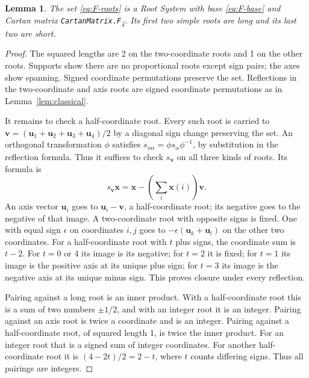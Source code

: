\documentclass[11pt]{amsart}
\newcommand\Zu{{\mathbf u}}
\newcommand\Zv{{\mathbf v}}
\newcommand\Zx{{\mathbf x}}
\newcommand\inv{^{-1}}
\newtheorem{lemma}[theorem]{Lemma}
\theoremstyle{definition}
\begin{document}
\begin{lemma}\label{lem:F}
The set \eqref{eq:F-roots} is a Root System with base \eqref{eq:F-base}
and Cartan matrix \texttt{CartanMatrix.F}\textsubscript{4}.
Its first two simple roots are long and its last two are short.
\end{lemma}
\begin{proof}
The squared lengths are 2 on the two-coordinate roots and 1 on the other
roots. Supports show there are no proportional roots except sign pairs;
the axes show spanning. Signed coordinate permutations preserve the set.
Reflections in the two-coordinate and axis roots are signed coordinate
permutations as in Lemma~\ref{lem:classical}.

It remains to check a half-coordinate root. Every such root is carried
to $\Zv=(\Zu_1+\Zu_2+\Zu_3+\Zu_4)/2$ by a diagonal sign change
preserving the set. An orthogonal transformation $\phi$ satisfies
$s_{\phi\alpha}=\phi s_\alpha\phi\inv$, by substitution in the reflection
formula. Thus it suffices to check $s_\Zv$ on all three kinds of
roots. Its formula is
\[
 s_\Zv\Zx=\Zx-\left(\sum_i\Zx(i)\right)\Zv.
\]
An axis vector $\Zu_i$ goes to $\Zu_i-\Zv$, a half-coordinate root;
its negative goes to the negative of that image. A two-coordinate root
with opposite signs is fixed. One with equal sign $\epsilon$ on
coordinates $i,j$ goes to $-\epsilon(\Zu_k+\Zu_l)$ on the other two
coordinates. For a half-coordinate root with $t$ plus signs, the
coordinate sum is $t-2$. For $t=0$ or 4 its image is its negative;
for $t=2$ it is fixed; for $t=1$ its image is the positive axis at its
unique plus sign; for $t=3$ its image is the negative axis at its unique
minus sign. This proves closure under every reflection.

Pairing against a long root is an inner product. With a half-coordinate
root this is a sum of two numbers $\pm1/2$, and with an integer root it
is an integer. Pairing against an axis root is twice a coordinate and
is an integer. Pairing against a half-coordinate root, of squared length
1, is twice the inner product. For an integer root that is a signed sum
of integer coordinates. For another half-coordinate root it is
$(4-2t)/2=2-t$, where $t$ counts differing signs. Thus all pairings
are integers.


\end{proof}
\end{document}
